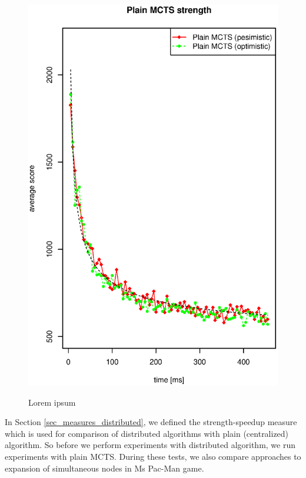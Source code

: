\begin{figure}
\begin{center}
\includegraphics{img/plain-mcts-strength-90.eps}
\end{center}
\caption{\footnotesize Lorem ipsum}{\footnotesize }
\label{fig_plain_mcts_strength}
\end{figure}

In Section \ref{sec_measures_distributed}, we defined the strength-speedup measure which
is used for comparison of distributed algorithms with plain (centralized) algorithm. So 
before we perform experiments with distributed algorithm, we run experiments with plain MCTS.
During these tests, we also compare approaches to expansion of simultaneous nodes in Ms Pac-Man
game.

